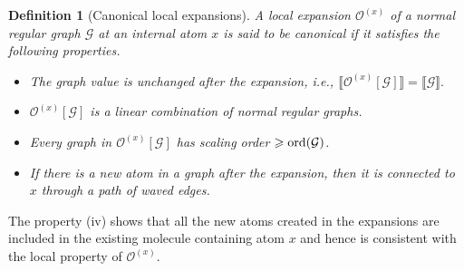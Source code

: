 \documentclass{article}
\newcommand{\1}{\mathds{1}}
\numberwithin{equation}{section}
\newcommand{\ord}{{\rm{ord}}}
\renewcommand{\cal}{\mathcal}
\renewcommand{\geq}{\geqslant}
\renewcommand{\ge}{\geq}
\theoremstyle{plain} %
\newtheorem{definition}[theorem]{Definition}
\theoremstyle{remark}
\newcommand{\cor}{\color{red}}
\newcommand{\hty}[1]{{\cor (ht: #1) }}
\begin{document}
\begin{definition}[Canonical local expansions]\label{def_canonical_local}
A local expansion $\cal O^{(x)}$ of a normal regular graph $\cal G$ at an internal atom $x$ is said to be \emph{canonical}
if it satisfies the following properties.
\begin{itemize}
	\item[(i)] The graph value is unchanged after the expansion, i.e.,  $ \llbracket {\cal O} ^{(x)}[\cal G]\rrbracket  =\llbracket \cal G \rrbracket.$ 
		
	\item[(ii)] $  {\cal O} ^{(x)}  [\cal G  ] $  is a linear combination of normal regular graphs. 
	
	\item[(iii)] Every graph in ${\cal O}^{(x)}[\cal G]$ has scaling order $\ge \ord(\cal G)$.
	
	\item[(iv)] %
	If there is a new atom in a graph after the expansion, then it is connected to $x$ through a path of waved edges.
\end{itemize}
\end{definition}


The property (iv) shows that all the new atoms created in the expansions are included in the existing molecule containing atom $x$
and hence is consistent with the local property of $\cal O^{(x)}$.%


\end{document}
